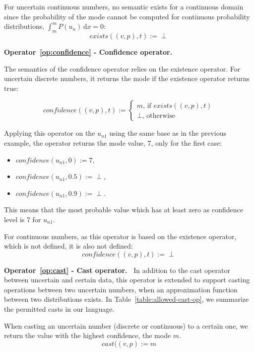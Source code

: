 For uncertain continuous numbers, no semantic exists for a continuous domain since the probability of the mode cannot be computed for continuous probability distributions, $\int_{m}^{m} P(u_n)\,\mathrm{d}x = 0$: 
$$exists((v, p), t) := \perp$$

\bigskip

\noindent\textbf{Operator~\ref{op:confidence} - Confidence operator.~}

The semantics of the confidence operator relies on the existence operator.
For uncertain discrete numbers, it returns the mode if the existence operator returns true:

$$confidence((v, p), t) :=  \begin{cases}
                                            m \text{, if } exists((v, p), t)\\
                                            \perp \text{, otherwise}
                                         \end{cases}$$
                                      
Applying this operator on the $u_{n1}$ using the same base as in the previous example, the operator returns the mode value, 7, only for the first case:
 \begin{itemize}
    \item $confidence(u_{n1}, 0) := 7$,
    \item $confidence(u_{n1}, 0.5) := \perp$,
    \item $confidence(u_{n1}, 0.9) := \perp$.
\end{itemize}

This means that the most probable value which has at least zero as confidence level is 7 for $u_{n1}$. 

For continuous numbers, as this operator is based on the existence operator, which is not defined, it is also not defined:
$$confidence((v, p), t) :=  \perp$$

\bigskip

\noindent\textbf{Operator~\ref{op:cast} - Cast operator.~}
In addition to the cast operator between uncertain and certain data, this operator is extended to support casting operations between two uncertain numbers, when an approximation function between two distributions exists.
In Table~\ref{table:allowed-cast-op}, we summarize the permitted casts in our language.

When casting an uncertain number (discrete or continuous) to a certain one, we return the value with the highest confidence, \ie the mode $m$.
$$cast((v, p) := m$$

